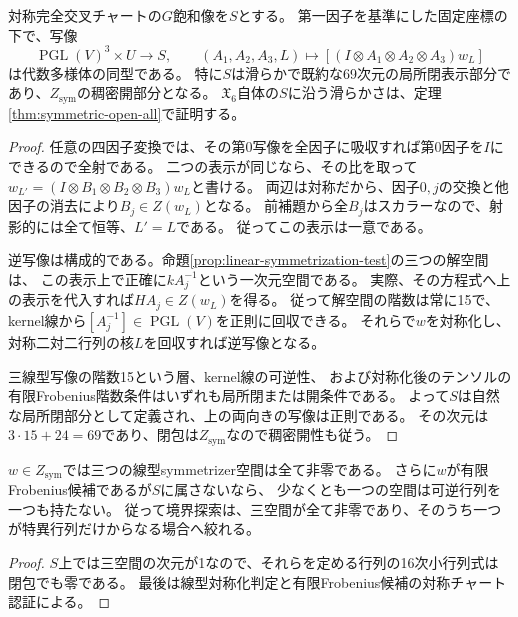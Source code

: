 \begin{theorem}[対称化可能な表示の大域的積モデル]\label{thm:symmetric-presentation-product}
対称完全交叉チャートの$G$飽和像を$S$とする。
第一因子を基準にした固定座標の下で、写像
\[
 \operatorname{PGL}(V)^3\times U\longrightarrow S,\qquad
 (A_1,A_2,A_3,L)\longmapsto
 [(I\otimes A_1\otimes A_2\otimes A_3)w_L]
\]
は代数多様体の同型である。
特に$S$は滑らかで既約な69次元の局所閉表示部分であり、$Z_{\mathrm{sym}}$の稠密開部分となる。
$\mathfrak X_6$自体の$S$に沿う滑らかさは、定理\ref{thm:symmetric-open-all}で証明する。
\end{theorem}
\begin{proof}
任意の四因子変換では、その第0写像を全因子に吸収すれば第0因子を$I$にできるので全射である。
二つの表示が同じなら、その比を取って
$w_{L'}=(I\otimes B_1\otimes B_2\otimes B_3)w_L$と書ける。
両辺は対称だから、因子$0,j$の交換と他因子の消去により$B_j\in Z(w_L)$となる。
前補題から全$B_j$はスカラーなので、射影的には全て恒等、$L'=L$である。
従ってこの表示は一意である。

逆写像は構成的である。命題\ref{prop:linear-symmetrization-test}の三つの解空間は、
この表示上で正確に$kA_j^{-1}$という一次元空間である。
実際、その方程式へ上の表示を代入すれば$HA_j\in Z(w_L)$を得る。
従って解空間の階数は常に15で、kernel線から$[A_j^{-1}]\in\operatorname{PGL}(V)$を正則に回収できる。
それらで$w$を対称化し、対称二対二行列の核$L$を回収すれば逆写像となる。

三線型写像の階数15という層、kernel線の可逆性、
および対称化後のテンソルの有限Frobenius階数条件はいずれも局所閉または開条件である。
よって$S$は自然な局所閉部分として定義され、上の両向きの写像は正則である。
その次元は$3\cdot15+24=69$であり、閉包は$Z_{\mathrm{sym}}$なので稠密開性も従う。
\end{proof}
\begin{corollary}[対称成分の未処理境界の必要条件]\label{cor:symmetric-boundary-singular-intertwiners}
$w\in Z_{\mathrm{sym}}$では三つの線型symmetrizer空間は全て非零である。
さらに$w$が有限Frobenius候補であるが$S$に属さないなら、
少なくとも一つの空間は可逆行列を一つも持たない。
従って境界探索は、三空間が全て非零であり、そのうち一つが特異行列だけからなる場合へ絞れる。
\end{corollary}
\begin{proof}
$S$上では三空間の次元が1なので、それらを定める行列の16次小行列式は閉包でも零である。
最後は線型対称化判定と有限Frobenius候補の対称チャート認証による。
\end{proof}

